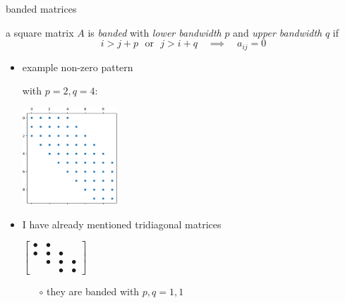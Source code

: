 \documentclass[10pt,
               svgnames,
               hyperref={colorlinks,citecolor=DeepPink4,linkcolor=FireBrick,urlcolor=Maroon},
               usepdftitle=false]{beamer}
\begin{document}
\begin{frame}{banded matrices}

\begin{definition}
a square matrix $A$ is \emph{banded} with \emph{lower bandwidth} $p$ and \emph{upper bandwidth} $q$ if
    $$i > j + p \,\,\text{ or }\,\, j > i + q \quad \implies \quad a_{ij} = 0$$
\end{definition}

\begin{itemize}
\item example non-zero pattern

with $p=2,q=4$:

\vspace{-7mm}
\hspace{55mm} \includegraphics[width=0.28\textwidth]{images/banded.png}

\medskip
\item I have already mentioned tridiagonal matrices

\vspace{-2mm}
\hfill
{\scriptsize $\displaystyle \begin{bmatrix} \bullet & \bullet & & \\ \bullet & \bullet & \bullet & \\ & \bullet & \bullet & \bullet \\ & & \bullet & \bullet \end{bmatrix}$} 

\vspace{-5mm}
   \begin{itemize}
   \item[$\circ$] they are banded with $p,q=1,1$
   \end{itemize}
\end{itemize}
\end{frame}
\end{document}
